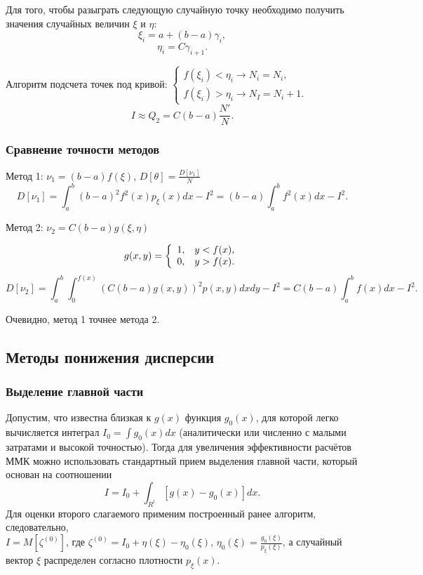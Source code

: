 \documentclass[
11pt,
master, %
subf, %
href, %
colorlinks=true, %
times, %
]{disser}
\begin{document}
Для того, чтобы разыграть следующую случайную точку необходимо получить значения случайных величин $\xi$ и $\eta$:
$$\xi_i = a + (b-a)\gamma_i,$$
$$\eta_i = C\gamma_{i+1}.$$

Алгоритм подсчета точек под кривой: $\left\{
                                      \begin{array}{ll}
                                        f(\xi_i) < \eta_i \rightarrow N_i = N_i, \\
                                        f(\xi_i) > \eta_i \rightarrow N_I = N_i + 1.
                                      \end{array}
                                    \right.$
\begin{equation}\label{eq11}
  I \approx Q_2 = C(b-a)\frac{N'}{N}.
\end{equation}

\subsubsection{Сравнение точности методов}
Метод 1: $\nu_1 = (b-a)f(\xi)$, $D[\theta] = \frac{D[\nu_1]}{N}$
\begin{equation}\label{eq12}
  D[\nu_1] = \int_{a}^{b}(b-a)^2f^2(x)p_{\xi}(x)dx - I^2 = (b-a)\int_{a}^{b} f^2(x)dx - I^2.
\end{equation}

Метод 2: $\nu_2 = C(b-a)g(\xi,\eta)$

$$g(x,y) = \left\{
             \begin{array}{ll}
               1, & \hbox{$y<f(x)$,} \\
               0, & \hbox{$y>f(x)$.}
             \end{array}
           \right.$$
\begin{equation}\label{eq13}
  D[\nu_2] = \int_{a}^{b} \int_{0}^{f(x)} (C(b-a)g(x,y))^2p(x,y)dxdy - I^2 = C(b-a)\int_{a}^{b}f(x)dx - I^2.
\end{equation}

Очевидно, метод 1 точнее метода 2.

\subsection{Методы понижения дисперсии}
\subsubsection{Выделение главной части}
Допустим, что известна близкая к $g(x)$ функция $g_0(x)$, для которой легко вычисляется интеграл $I_0 = \int g_0(x)dx$ (аналитически или численно с малыми затратами и высокой точностью). Тогда для увеличения эффективности расчётов ММК можно использовать стандартный прием выделения главной части, который основан на соотношении
$$I = I_0 + \int_{R^l}[g(x)-g_0(x)]dx.$$
Для оценки второго слагаемого применим построенный ранее алгоритм, следовательно,\\
$I=M\left[\zeta^{(0)}\right]$, где $\zeta^{(0)} = I_0 + \eta(\xi) - \eta_0(\xi)$, $\eta_0(\xi) = \frac{g_0(\xi)}{p_{\xi}(\xi)}$, а случайный вектор $\xi$ распределен согласно плотности $p_{\xi}(x)$.
\end{document}

